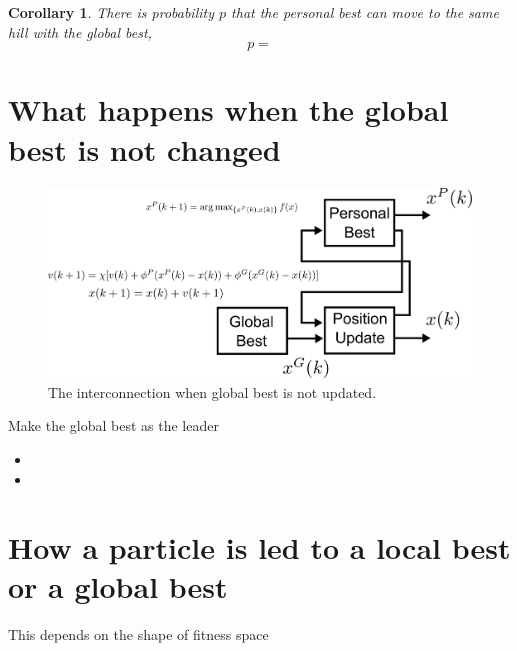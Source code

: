 \documentclass[10pt,a4paper]{article}
\newtheorem{corollary}{Corollary}
\begin{document}
\begin{corollary}
There is probability $ p $ that the personal best can move to the same hill with the global best,
\begin{equation}
p = 
\end{equation}
\end{corollary}

\section{What happens when the global best is not changed}

\begin{figure}
\centering
\includegraphics[width=0.8\linewidth]{./structure_constant_gb}
\caption{The interconnection when global best is not updated.}
\label{fig:structure_constant_gb}
\end{figure}


Make the global best as the leader

\begin{itemize}
\item 
\item 
\end{itemize}

\section{How a particle is led to a local best or a global best}

This depends on the shape of fitness space
\end{document}
